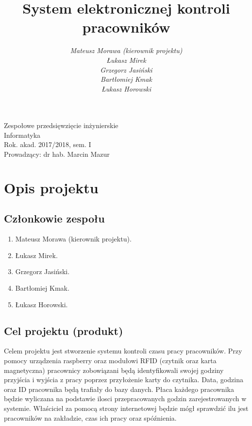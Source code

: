 \documentclass[a4paper]{article}
\title{\bf{System elektronicznej kontroli pracowników}}
\author{{\em Mateusz Morawa (kierownik projektu)}\\
{\em Łukasz Mirek}\\
{\em Grzegorz Jasiński}\\
{\em Bartłomiej Kmak}\\
{\em Łukasz Horowski}\\
}
\date{}
\begin{document}
\begin{titlepage}
\maketitle
\thispagestyle{empty}
\bigskip
\begin{center}
Zespołowe przedsięwzięcie inżynierskie\\[2mm]

Informatyka\\[2mm]

Rok. akad. 2017/2018, sem. I\\[2mm]

Prowadzący: dr hab. Marcin Mazur
\end{center}
\end{titlepage}

\tableofcontents
\thispagestyle{empty}

\newpage

\section{Opis projektu}

\subsection{Członkowie zespołu}

\begin{enumerate}
\item Mateusz Morawa (kierownik projektu).
\item Łukasz Mirek.
\item Grzegorz Jasiński.
\item Bartłomiej Kmak.
\item Łukasz Horowski.
\end{enumerate}

\subsection{Cel projektu (produkt)}

Celem projektu jest stworzenie systemu kontroli czasu pracy pracowników. Przy pomocy urządzenia raspberry oraz modułowi RFID (czytnik oraz karta magnetyczna) pracownicy zobowiązani będą identyfikowali swojej godziny przyjścia i wyjścia z pracy poprzez przyłożenie karty do czytnika. Data, godzina oraz ID pracownika będą trafiały do bazy danych. Płaca każdego pracownika będzie wyliczana na podstawie ilosci przepracowanych godzin zarejestrowanych w systemie. Właściciel za pomocą strony internetowej będzie mógł sprawdzić ilu jest  pracowników na zakładzie, czas ich pracy oraz spóźnienia.
\end{document}
